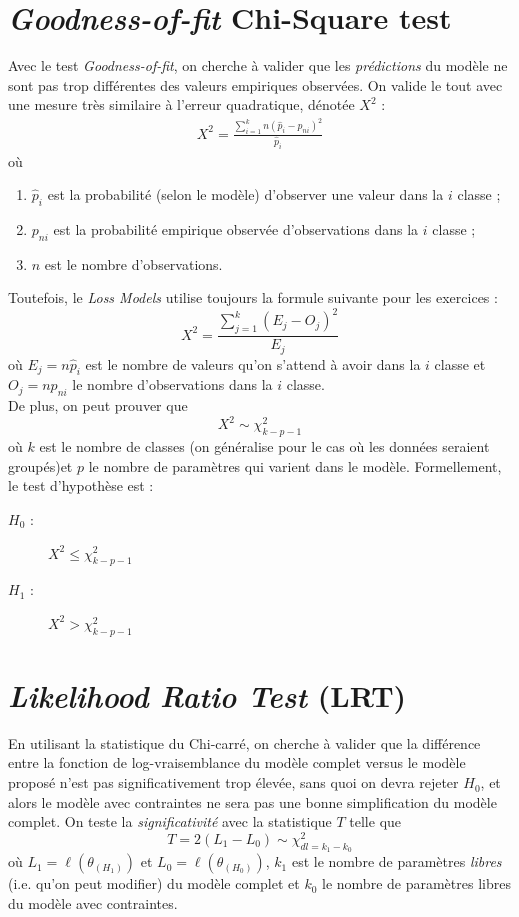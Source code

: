 \documentclass[12pt, french]{report}
\begin{document}
\section{\emph{Goodness-of-fit} Chi-Square test}
\label{sec:goodness-of-fit}
Avec le test \emph{Goodness-of-fit}, on cherche à valider que les \emph{prédictions} du modèle ne sont pas trop différentes des valeurs empiriques observées. On valide le tout avec une mesure très similaire à l'erreur quadratique, dénotée $X^2$ : 
\begin{align*}
X^2 = \frac{\sum_{i=1}^{k} n(\hat{p}_i - p_{ni})^2 }{\hat{p}_i}
\end{align*}
où
\begin{enumerate}[label=\faAngleRight]
\item $\hat{p}_i$ est la probabilité (selon le modèle) d'observer une valeur dans la $i$ classe ;
\item $p_{ni}$ est la probabilité empirique observée d'observations dans la $i$ classe ;
\item $n$ est le nombre d'observations.
\end{enumerate}
Toutefois, le \emph{Loss Models} utilise toujours la formule suivante pour les exercices :
\begin{equation}
X^2 = \frac{\sum_{j=1}^{k}(E_j - O_j)^2 }{E_j}
\end{equation}
où $E_j = n \hat{p}_i$ est le nombre de valeurs qu'on s'attend à avoir dans la $i$ classe et $O_j = n p_{ni}$ le nombre d'observations dans la $i$ classe. \\

De plus, on peut prouver que
\[X^2 \sim \chi_{k-p-1}^2\]
où $k$ est le nombre de classes (on généralise pour le cas où les données seraient groupés)et $p$ le nombre de paramètres qui varient dans le modèle. Formellement, le test d'hypothèse est : 
\begin{description}
\item[$H_0$ : ] $X^2 \leq  \chi_{k-p-1}^2$
\item[$H_1$ : ] $X^2 > \chi_{k-p-1}^2$
\end{description}



\section{\emph{Likelihood Ratio Test} (LRT)}
\label{sec:likelihood-ratio-test}
En utilisant la statistique du Chi-carré, on cherche à valider que la différence entre la fonction de log-vraisemblance du modèle complet versus le modèle proposé n'est pas significativement trop élevée, sans quoi on devra rejeter $H_0$, et alors le modèle avec contraintes ne sera pas une bonne simplification du modèle complet. On teste la \emph{significativité} avec la statistique $T$ telle que
\begin{equation}
T = 2 \left( L_1 - L_0 \right) \sim \chi_{dl = k_1 - k_0}^{2}
\end{equation}
où $L_1  = \ell(\theta_{(H_1)})$ et $L_0 = \ell(\theta_{(H_0)})$, $k_1$ est le nombre de paramètres \emph{libres} (i.e. qu'on peut modifier) du modèle complet et $k_0$ le nombre de paramètres libres du modèle avec contraintes.
\end{document}
